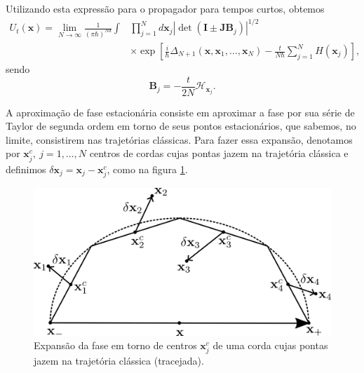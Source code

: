 \documentclass[
	12pt,
	oneside,			%
	a4paper,			%
	english,			%
	brazil				%
	]{abntex2}
\theoremstyle{definition}
\begin{document}
Utilizando esta expressão para o propagador para tempos curtos, obtemos
\begin{equation}
    \begin{aligned}
        U_t \left( \mathbf{x} \right) = \lim_{N \to \infty} \frac{1}{\left( \pi \hbar \right)^{Nd}}\int &\prod_{j=1}^{N} d \mathbf{x}_j \left| \det \left( \mathbf{I} \pm \mathbf{JB}_j \right) \right|^{1/2}  \\ &\times \exp \left[ \frac{i}{\hbar} \Delta_{N+1} \left( \mathbf{x},\mathbf{x}_1,\ldots,\mathbf{x}_{N} \right) - \frac{t}{N \hbar}\sum_{j=1}^{N} H(\mathbf{x}_j) \right],
    \end{aligned}
\end{equation}
sendo
\begin{equation}
    \mathbf{B}_j = - \frac{t}{2N} \boldsymbol{\mathcal{H}}_{\mathbf{x}_j}.
\end{equation}

A aproximação de fase estacionária consiste em aproximar a fase por sua série de Taylor de segunda ordem em torno de seus pontos estacionários, que sabemos, no limite, consistirem nas trajetórias clássicas. Para fazer essa expansão, denotamos por $\mathbf{x}^c_j, \ j = 1,\ldots, N$ centros de cordas cujas pontas jazem na trajetória clássica e definimos $\delta \mathbf{x}_j = \mathbf{x}_j - \mathbf{x}_j^c$, como na figura \ref{expansão em torno da trajetória clássica}.

\begin{figure}[H]
    \includegraphics[width=.7\textwidth]{Imagens/expansao_em_torno_da_trajetoria_classica.png}
    \centering
    \caption{Expansão da fase em torno de centros $\mathbf{x}_j^c$ de uma corda cujas pontas jazem na trajetória clássica (tracejada).}
    \label{expansão em torno da trajetória clássica}
\end{figure}
\end{document}
